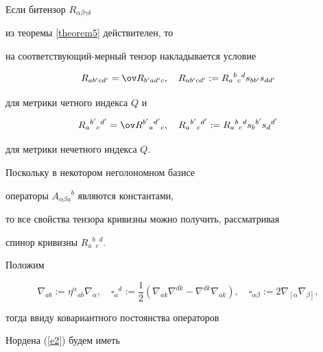 \begin{note}


\label{theorem7}


Если битензор $R_{\alpha\beta\gamma\delta}$


из теоремы \ref{theorem5} действителен, то


на соответствующий-мерный тензор накладывается условие


$$


\label{e67}


R_{ab'cd'}=\ov R_{b'ad'c},\quad


R_{ab'cd'}:=R_a{}^b{}_c{}^ds_{bb'}s_{dd'}


$$


для метрики четного индекса $Q$ и


$$


\label{e68}


R_a{}^{b'}{}_c{}^{d'}=\ov R^{b'}{}_a{}^{d'}{}_c,\quad


R_a{}^{b'}{}_c{}^{d'}:=R_a{}^b{}_c{}^ds_b{}^{b'}s_d{}^{d'}


$$


для метрики нечетного индекса $Q$.


\end{note}





Поскольку в некотором неголономном базисе


операторы $A_{\alpha\beta a}{}^b$ являются константами,


то все свойства тензора кривизны можно получить, рассматривая


спинор кривизны $R_a{}^b{}_c{}^d$.


Положим


$$


\label{e69}


\nabla_{ab}:=\eta^\alpha{}_{ab}\nabla_\alpha,\quad


\square_a{}^d:=\frac{1}{2}


(\nabla_{ak}\nabla^{dk}-


\nabla^{dk}\nabla_{ak}),\quad


\square_{\alpha\beta}:=


2\nabla_{\left[\right.\alpha}\nabla_{\beta\left.\right]},


$$


тогда ввиду ковариантного постоянства операторов


Нордена (\ref{e2}) будем иметь


